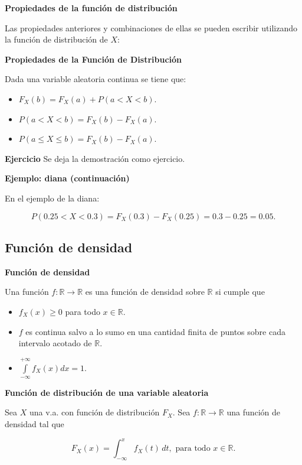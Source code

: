 \documentclass[]{book}
\providecommand{\tightlist}{%
  \setlength{\itemsep}{0pt}\setlength{\parskip}{0pt}}
\begin{document}
\textbf{Propiedades de la función de distribución}

Las propiedades anteriores y combinaciones de ellas se pueden
escribir utilizando la función de distribución de \(X\):

 \textbf{Propiedades de la Función de Distribución}

Dada una variable aleatoria continua se tiene que:

\begin{itemize}
\tightlist
\item
  \(F_{X}(b)=F_{X}(a)+P(a<X<b)\).
\item
  \(P(a<X<b)=F_{X}(b)-F_{X}(a)\).
\item
  \(P(a\leq X\leq b)=F_{X}(b)-F_{X}(a)\).
\end{itemize}

\textbf{Ejercicio}
Se deja la demostración como ejercicio.

\textbf{Ejemplo: diana (continuación)}

En el ejemplo de la diana:

\[P(0.25<X<0.3)=F_{X}(0.3)-F_{X}(0.25)=0.3-0.25=0.05.\]

\hypertarget{funciuxf3n-de-densidad}{%
\subsection{Función de densidad}\label{funciuxf3n-de-densidad}}

 \textbf{Función de densidad}

Una función \(f:\mathbb{R}\to\mathbb{R}\) es una función de densidad sobre \(\mathbb{R}\) si cumple que

\begin{itemize}
\tightlist
\item
  \(f_{X}(x)\geq 0\) para todo \(x \in\mathbb{R}.\)
\item
  \(f\) es continua salvo a lo sumo en una cantidad finita de puntos sobre
  cada intervalo acotado de \(\mathbb{R}\).
\item
  \(\displaystyle\int\limits_{-\infty}^{+\infty} f_{X}(x) dx=1.\)
\end{itemize}

 \textbf{Función de distribución de una variable aleatoria}

Sea \(X\) una v.a. con función de distribución \(F_X\). Sea \(f:\mathbb{R}\to\mathbb{R}\) una función de densidad tal que

\[F_X(x)=\displaystyle\int_{-\infty}^{x} f_X(t)\,dt,\mbox{ para todo } x\in\mathbb{R}.\]
\end{document}
